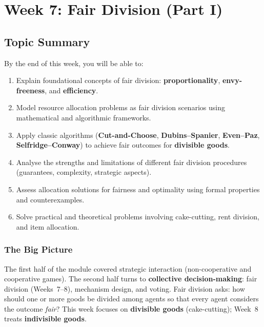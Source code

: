 \section{Week 7: Fair Division (Part I)}

\subsection{Topic Summary}

\begin{keybox}
By the end of this week, you will be able to:
\begin{enumerate}
  \item Explain foundational concepts of fair division: \textbf{proportionality}, \textbf{envy-freeness}, and \textbf{efficiency}.
  \item Model resource allocation problems as fair division scenarios using mathematical and algorithmic frameworks.
  \item Apply classic algorithms (\textbf{Cut-and-Choose}, \textbf{Dubins--Spanier}, \textbf{Even--Paz}, \textbf{Selfridge--Conway}) to achieve fair outcomes for \textbf{divisible goods}.
  \item Analyse the strengths and limitations of different fair division procedures (guarantees, complexity, strategic aspects).
  \item Assess allocation solutions for fairness and optimality using formal properties and counterexamples.
  \item Solve practical and theoretical problems involving cake-cutting, rent division, and item allocation.
\end{enumerate}
\end{keybox}

\separator

\subsubsection*{The Big Picture}

The first half of the module covered strategic interaction (non-cooperative and cooperative games). The second half turns to \textbf{collective decision-making}: fair division (Weeks~7--8), mechanism design, and voting. Fair division asks: how should one or more goods be divided among agents so that every agent considers the outcome \emph{fair}? This week focuses on \textbf{divisible goods} (cake-cutting); Week~8 treats \textbf{indivisible goods}.

